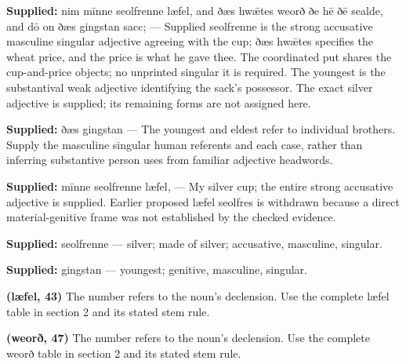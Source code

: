 \textbf{Supplied:} nim mīnne seolfrenne læfel, and ðæs hwǣtes weorð ðe hē ðē sealde, and dō on ðæs gingstan sacc; — Supplied seolfrenne is the strong accusative masculine singular adjective agreeing with the cup; ðæs hwǣtes specifies the wheat price, and the price is what he gave thee. The coordinated put shares the cup-and-price objects; no unprinted singular it is required. The youngest is the substantival weak adjective identifying the sack’s possessor. The exact silver adjective is supplied; its remaining forms are not assigned here.

\textbf{Supplied:} ðæs gingstan — The youngest and eldest refer to individual brothers. Supply the masculine singular human referents and each case, rather than inferring substantive person uses from familiar adjective headwords.

\textbf{Supplied:} mīnne seolfrenne læfel, — My silver cup; the entire strong accusative adjective is supplied. Earlier proposed læfel seolfres is withdrawn because a direct material-genitive frame was not established by the checked evidence.

\textbf{Supplied:} seolfrenne — silver; made of silver; accusative, masculine, singular.

\textbf{Supplied:} gingstan — youngest; genitive, masculine, singular.

\textbf{(læfel, 43)} The number refers to the noun’s declension. Use the complete læfel table in section 2 and its stated stem rule.

\textbf{(weorð, 47)} The number refers to the noun’s declension. Use the complete weorð table in section 2 and its stated stem rule.

